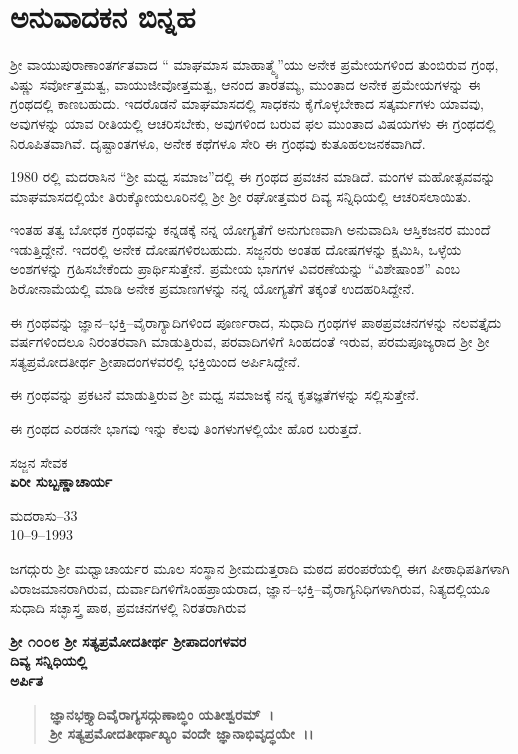 
\chapter*{ಅನುವಾದಕನ ಬಿನ್ನಹ}

 ಶ‍್ರೀ ವಾಯುಪುರಾಣಾಂತರ್ಗತವಾದ “ ಮಾಘಮಾಸ ಮಾಹಾತ್ಮ್ಯೆ”ಯು ಅನೇಕ ಪ್ರಮೇಯಗಳಿಂದ ತುಂಬಿರುವ ಗ್ರಂಥ, ವಿಷ್ಣು ಸರ್ವೋತ್ತಮತ್ವ, ವಾಯುಜೀವೋತ್ತಮತ್ವ, ಆನಂದ ತಾರತಮ್ಯ, ಮುಂತಾದ ಅನೇಕ ಪ್ರಮೇಯಗಳನ್ನು ಈ ಗ್ರಂಥದಲ್ಲಿ ಕಾಣಬಹುದು. ಇದರೊಡನೆ ಮಾಘಮಾಸದಲ್ಲಿ ಸಾಧಕನು ಕೈಗೊಳ್ಳಬೇಕಾದ ಸತ್ಕರ್ಮಗಳು ಯಾವವು, ಅವುಗಳನ್ನು ಯಾವ ರೀತಿಯಲ್ಲಿ ಆಚರಿಸಬೇಕು, ಅವುಗಳಿಂದ ಬರುವ ಫಲ ಮುಂತಾದ ವಿಷಯಗಳು ಈ ಗ್ರಂಥದಲ್ಲಿ ನಿರೂಪಿತವಾಗಿವೆ. ದೃಷ್ಟಾಂತಗಳೂ, ಅನೇಕ ಕಥೆಗಳೂ ಸೇರಿ ಈ ಗ್ರಂಥವು ಕುತೂಹಲಜನಕವಾಗಿದೆ.

1980 ರಲ್ಲಿ ಮದರಾಸಿನ “ಶ‍್ರೀ ಮಧ್ವ ಸಮಾಜ”ದಲ್ಲಿ ಈ ಗ್ರಂಥದ ಪ್ರವಚನ ಮಾಡಿದೆ. ಮಂಗಳ ಮಹೋತ್ಸವವನ್ನು ಮಾಘಮಾಸದಲ್ಲಿಯೇ ತಿರುಕ್ಕೋಯಲೂರಿನಲ್ಲಿ ಶ‍್ರೀ ಶ‍್ರೀ ರಘೋತ್ತಮರ ದಿವ್ಯ ಸನ್ನಿಧಿಯಲ್ಲಿ ಆಚರಿಸಲಾಯಿತು.

ಇಂತಹ ತತ್ವ ಬೋಧಕ ಗ್ರಂಥವನ್ನು ಕನ್ನಡಕ್ಕೆ ನನ್ನ ಯೋಗ್ಯತೆಗೆ ಅನುಗುಣವಾಗಿ ಅನುವಾದಿಸಿ ಆಸ್ತಿಕಜನರ ಮುಂದೆ ಇಡುತ್ತಿದ್ದೇನೆ. ಇದರಲ್ಲಿ ಅನೇಕ ದೋಷಗಳಿರಬಹುದು. ಸಜ್ಜನರು ಅಂತಹ ದೋಷಗಳನ್ನು ಕ್ಷಮಿಸಿ, ಒಳ್ಳೆಯ ಅಂಶಗಳನ್ನು ಗ್ರಹಿಸಬೇಕೆಂದು ಪ್ರಾರ್ಥಿಸು\-ತ್ತೇನೆ. ಪ್ರಮೇಯ ಭಾಗಗಳ ವಿವರಣೆಯನ್ನು “ವಿಶೇಷಾಂಶ” ಎಂಬ ಶಿರೋನಾಮೆಯಲ್ಲಿ ಮಾಡಿ ಅನೇಕ ಪ್ರಮಾಣಗಳನ್ನು ನನ್ನ ಯೋಗ್ಯತೆಗೆ ತಕ್ಕಂತೆ ಉದಹರಿಸಿದ್ದೇನೆ.

ಈ ಗ್ರಂಥವನ್ನು ಜ್ಞಾನ–ಭಕ್ತಿ–ವೈರಾಗ್ಯಾದಿಗಳಿಂದ ಪೂರ್ಣರಾದ, ಸುಧಾದಿ ಗ್ರಂಥಗಳ ಪಾಠಪ್ರವಚನಗಳನ್ನು ನಲವತ್ತೈದು ವರ್ಷಗಳಿಂದಲೂ ನಿರಂತರವಾಗಿ ಮಾಡುತ್ತಿರುವ, ಪರವಾದಿಗಳಿಗೆ ಸಿಂಹದಂತೆ ಇರುವ, ಪರಮಪೂಜ್ಯರಾದ ಶ‍್ರೀ ಶ‍್ರೀ ಸತ್ಯಪ್ರಮೋದತೀರ್ಥ ಶ‍್ರೀಪಾದಂಗಳವರಲ್ಲಿ ಭಕ್ತಿಯಿಂದ ಅರ್ಪಿಸಿದ್ದೇನೆ.

\newpage

ಈ ಗ್ರಂಥವನ್ನು ಪ್ರಕಟನೆ ಮಾಡುತ್ತಿರುವ ಶ‍್ರೀ ಮಧ್ವ ಸಮಾಜಕ್ಕೆ ನನ್ನ ಕೃತಜ್ಞತೆಗಳನ್ನು ಸಲ್ಲಿಸುತ್ತೇನೆ.

ಈ ಗ್ರಂಥದ ಎರಡನೇ ಭಾಗವು ಇನ್ನು ಕೆಲವು ತಿಂಗಳುಗಳಲ್ಲಿಯೇ ಹೊರ ಬರುತ್ತದೆ.

\begin{flushright}
ಸಜ್ಜನ ಸೇವಕ \\\textbf{ ಏರೀ ಸುಬ್ಬಣ್ಣಾಚಾರ್ಯ}
\end{flushright}

\begin{flushleft}
ಮದರಾಸು–33 \\ 10–9–1993
\end{flushleft}

\newpage

\begin{center}
\end{center}

ಜಗದ್ಗುರು ಶ‍್ರೀ ಮಧ್ವಾಚಾರ್ಯರ ಮೂಲ ಸಂಸ್ಥಾನ ಶ‍್ರೀಮದುತ್ತರಾದಿ ಮಠದ ಪರಂಪರೆಯಲ್ಲಿ ಈಗ ಪೀಠಾಧಿಪತಿಗಳಾಗಿ ವಿರಾಜಮಾನರಾಗಿರುವ, ದುರ್ವಾದಿಗಳಿಗೆ\break ಸಿಂಹಪ್ರಾಯರಾದ, ಜ್ಞಾನ–ಭಕ್ತಿ–ವೈರಾಗ್ಯನಿಧಿಗಳಾಗಿರುವ, ನಿತ್ಯದಲ್ಲಿಯೂ ಸುಧಾದಿ ಸಚ್ಛಾಸ್ತ್ರ ಪಾಠ, ಪ್ರವಚನಗಳಲ್ಲಿ ನಿರತರಾಗಿರುವ

\begin{center}
\textbf{ಶ‍್ರೀ ೧೦೦೮ ಶ‍್ರೀ ಸತ್ಯಪ್ರಮೋದತೀರ್ಥ ಶ‍್ರೀಪಾದಂಗಳವರ} \\\textbf{ದಿವ್ಯ ಸನ್ನಿಧಿಯಲ್ಲಿ} \\\textbf{ಅರ್ಪಿತ} 
\end{center}

\begin{verse}
\textbf{ಜ್ಞಾನಭಕ್ತ್ಯಾದಿವೈರಾಗ್ಯಸದ್ಗುಣಾಬ್ಧಿಂ ಯತೀಶ್ವರಮ್~।}\\\textbf{ಶ‍್ರೀ ಸತ್ಯಪ್ರಮೋದತೀರ್ಥಾಖ್ಯಂ ವಂದೇ ಜ್ಞಾನಾಭಿವೃದ್ಧಯೇ~।।}
\end{verse}

\emptypage

